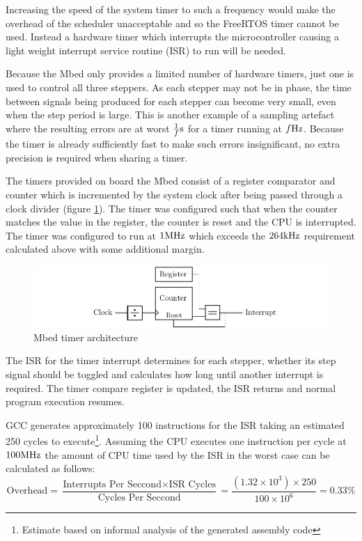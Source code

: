 				Increasing the speed of the system timer to such a frequency would make
				the overhead of the scheduler unacceptable and so the FreeRTOS timer
				cannot be used. Instead a hardware timer which interrupts the
				microcontroller causing a light weight interrupt service routine (ISR)
				to run will be needed.
				
				Because the Mbed only provides a limited number of hardware timers, just
				one is used to control all three steppers. As each stepper may not be in
				phase, the time between signals being produced for each stepper can
				become very small, even when the step period is large. This is another
				example of a sampling artefact where the resulting errors are at worst
				$\frac{1}{f}\textrm{s}$ for a timer running at $f\textrm{Hz}$. Because the timer is
				already sufficiently fast to make such errors insignificant, no extra
				precision is required when sharing a timer.
				
				The timers provided on board the Mbed consist of a register comparator
				and counter which is incremented by the system clock after being passed
				through a clock divider (figure \ref{fig:timerArch}). The timer was
				configured such that when the counter matches the value in the register,
				the counter is reset and the CPU is interrupted. The timer was
				configured to run at $1\textrm{MHz}$ which exceeds the $264\textrm{kHz}$ requirement
				calculated above with some additional margin.
				
				\begin{figure}
					\includegraphics[width=1\textwidth]{diagrams/timerArch.pdf}
					\caption{Mbed timer architecture}
					\label{fig:timerArch}
				\end{figure}
				
				The ISR for the timer interrupt determines for each stepper, whether its
				step signal should be toggled and calculates how long until another
				interrupt is required. The timer compare register is updated, the ISR
				returns and normal program execution resumes.
				
				GCC generates approximately 100 instructions for the ISR taking an
				estimated 250 cycles to execute\footnote{Estimate based on informal
				analysis of the generated assembly code}. Assuming the CPU executes one
				instruction per cycle at $100\textrm{MHz}$ the amount of CPU time used by the
				ISR in the worst case can be calculated as follows:
				\begin{equation}
					\textrm{Overhead} =
					\frac{\textrm{Interrupts Per Seccond} \times \textrm{ISR Cycles}}
					     {\textrm{Cycles Per Seccond}} =
					\frac{(1.32\times10^3) \times 250}
					     {100\times10^6} = 0.33\%
				\end{equation}
				
